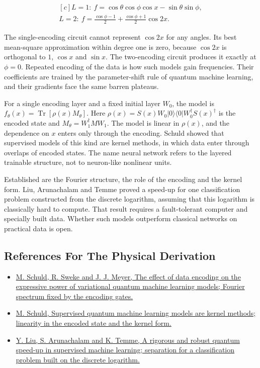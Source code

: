 \documentclass[11pt,oneside]{book}
\newenvironment{centeredalign}{\[\begin{gathered}[c]}{\end{gathered}\]}
\begin{document}
\begin{centeredalign}
L=1:\ f=\cos\theta\cos\phi\cos x-\sin\theta\sin\phi,\\
L=2:\ f=\frac{\cos\phi-1}{2}+\frac{\cos\phi+1}{2}\cos2x.
\end{centeredalign}

The single-encoding circuit cannot represent \(\cos2x\) for any angles. Its best mean-square approximation within degree one is zero, because \(\cos2x\) is orthogonal to \(1\), \(\cos x\) and \(\sin x\). The two-encoding circuit produces it exactly at \(\phi=0\). Repeated encoding of the data is how such models gain frequencies. Their coefficients are trained by the parameter-shift rule of quantum machine learning, and their gradients face the same barren plateaus.

For a single encoding layer and a fixed initial layer \(W_0\), the model is \(f_\theta(x)=\operatorname{Tr}[\rho(x)M_\theta]\). Here \(\rho(x)=S(x)W_0|0\rangle\langle0|W_0^\dagger S(x)^\dagger\) is the encoded state and \(M_\theta=W_1^\dagger MW_1\). The model is linear in \(\rho(x)\), and the dependence on \(x\) enters only through the encoding. Schuld showed that supervised models of this kind are kernel methods, in which data enter through overlaps of encoded states. The name neural network refers to the layered trainable structure, not to neuron-like nonlinear units.

Established are the Fourier structure, the role of the encoding and the kernel form. Liu, Arunachalam and Temme proved a speed-up for one classification problem constructed from the discrete logarithm, assuming that this logarithm is classically hard to compute. That result requires a fault-tolerant computer and specially built data. Whether such models outperform classical networks on practical data is open.

\subsection*{References For The Physical Derivation}
\begin{itemize}
\item \href{https://arxiv.org/abs/2008.08605}{M. Schuld, R. Sweke and J. J. Meyer, The effect of data encoding on the expressive power of variational quantum machine learning models; Fourier spectrum fixed by the encoding gates.}
\item \href{https://arxiv.org/abs/2101.11020}{M. Schuld, Supervised quantum machine learning models are kernel methods; linearity in the encoded state and the kernel form.}
\item \href{https://arxiv.org/abs/2010.02174}{Y. Liu, S. Arunachalam and K. Temme, A rigorous and robust quantum speed-up in supervised machine learning; separation for a classification problem built on the discrete logarithm.}
\end{itemize}
\end{document}
